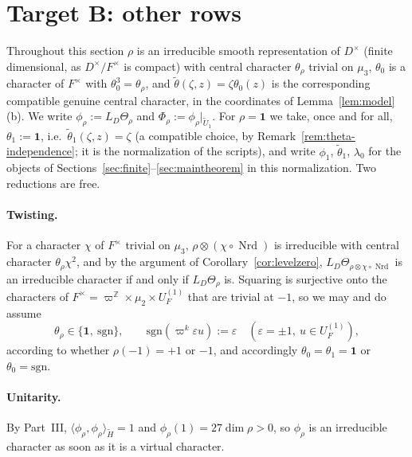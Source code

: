 \documentclass[11pt]{article}
\newcommand{\Z}{\mathbb Z}
\newcommand{\Nrd}{\operatorname{Nrd}}
\newcommand{\tH}{\widetilde H}
\newcommand{\tU}{\widetilde U}
\newcommand{\tth}{\widetilde\theta}
\theoremstyle{plain}
\theoremstyle{definition}
\begin{document}
\section{Target B: other rows}\label{sec:plan}
Throughout this section $\rho$ is an irreducible smooth representation of
$D^\times$ (finite dimensional, as $D^\times/F^\times$ is compact) with
central character $\theta_\rho$ trivial on $\mu_3$, $\theta_0$ is a
character of $F^\times$ with $\theta_0^3=\theta_\rho$, and
$\tth(\zeta,z)=\zeta\theta_0(z)$ is the corresponding compatible genuine
central character, in the coordinates of Lemma~\ref{lem:model}(b).  We
write $\phi_\rho:=L_D\Theta_\rho$ and $\Phi_\rho:=\phi_\rho|_{\tU_1}$.
For $\rho=\mathbf1$ we take, once and for all, $\theta_1:=\mathbf1$,
i.e.\ $\tth_1(\zeta,z)=\zeta$ (a compatible choice, by
Remark~\ref{rem:theta-independence}; it is the normalization of the
scripts), and write $\phi_1$, $\tth_1$, $\lambda_0$ for the objects of
Sections~\ref{sec:finite}--\ref{sec:maintheorem} in this normalization.
Two reductions are free.

\paragraph{Twisting.}  For a character $\chi$ of $F^\times$ trivial on
$\mu_3$, $\rho\otimes(\chi\circ\Nrd)$ is irreducible with central
character $\theta_\rho\chi^2$, and by the argument of
Corollary~\ref{cor:levelzero}, $L_D\Theta_{\rho\otimes\chi\circ\Nrd}$ is
an irreducible character if and only if $L_D\Theta_\rho$ is.  Squaring
is surjective onto the characters of $F^\times=\varpi^{\Z}\times\mu_2\times U_F^{(1)}$
that are trivial at $-1$, so we may and do assume
\begin{equation}\label{eq:normalized-central}
 \theta_\rho\in\{\mathbf1,\ \mathrm{sgn}\},\qquad
 \mathrm{sgn}(\varpi^k\varepsilon u):=\varepsilon\quad(\varepsilon=\pm1,\ u\in U_F^{(1)}),
\end{equation}
according to whether $\rho(-1)=+1$ or $-1$, and accordingly
$\theta_0=\theta_1=\mathbf1$ or $\theta_0=\mathrm{sgn}$.

\paragraph{Unitarity.}  By Part~III, $\langle\phi_\rho,\phi_\rho\rangle_{\tH}=1$
and $\phi_\rho(1)=27\dim\rho>0$, so $\phi_\rho$ is an irreducible
character as soon as it is a virtual character.
\end{document}
